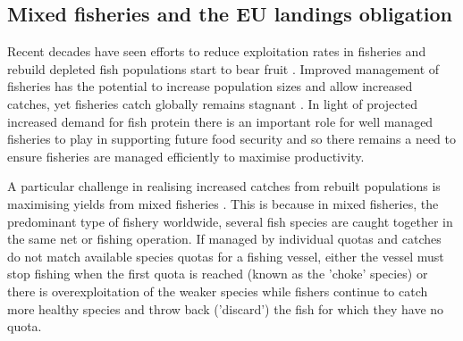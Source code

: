 \documentclass{nature}
\begin{document}
\begin{linenumbers}
\begin{abstract}
\end{abstract}

\section*{}

\subsection{Mixed fisheries and the EU landings obligation} 

Recent decades have seen efforts to reduce exploitation rates in fisheries and
rebuild depleted fish populations start to bear fruit \cite{Worm2009}.
Improved management of fisheries has the potential to increase population sizes
and allow increased catches, yet fisheries catch globally remains stagnant
\cite{FAO2016}.  In light of projected increased demand for fish protein
\cite{B??n??2016} there is an important role for well managed fisheries to play
in supporting future food security \cite{Mcclanahan2015} and so there remains a
need to ensure fisheries are managed efficiently to maximise productivity.

A particular challenge in realising increased catches from rebuilt populations
is maximising yields from mixed fisheries \cite{Branch2008, Kuriyama2016,
	Ulrich2016}. This is because in mixed fisheries, the predominant type
of fishery worldwide, several fish species are caught together in the same net
or fishing operation. If managed by individual quotas and catches do not match
available species quotas for a fishing vessel, either the vessel must stop
fishing when the first quota is reached (known as the 'choke' species) or there
is overexploitation of the weaker species while fishers continue to catch more
healthy species and throw back ('discard') the fish for which they have no
quota.


\end{linenumbers}
\end{document}
